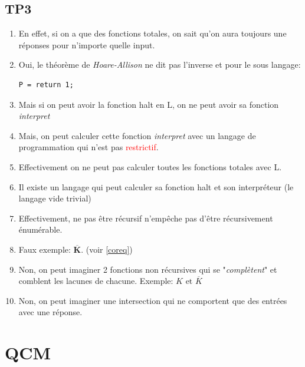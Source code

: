 \documentclass{report}
\begin{document}
\section{TP3}
\begin{enumerate}
\item En effet, si on a que des fonctions totales, on sait qu'on aura toujours une réponses pour n'importe quelle input.
\item Oui, le théorème de \textit{Hoare-Allison} ne dit pas l'inverse et pour le sous langage:
\begin{lstlisting}
P = return 1;
\end{lstlisting}
\item Mais si on peut avoir la fonction halt en L, on ne peut avoir sa fonction \textit{interpret}
\item Mais, on peut calculer cette fonction \textit{interpret} avec un langage de programmation qui n'est pas \textcolor{red}{restrictif}.
\item Effectivement on ne peut pas calculer toutes les fonctions totales avec L.
\item Il existe un langage qui peut calculer sa fonction halt et son interpréteur (le langage vide trivial)
\item Effectivement, ne pas être récursif n'empêche pas d'être récursivement énumérable.
\item Faux exemple: $\overline{\textbf{K}}$. (voir \ref{coreq})
\item Non, on peut imaginer 2 fonctions non récursives qui se "\textit{complètent}" et comblent les lacunes de chacune. Exemple: $K \text{ et } \overline{K}$
\item Non, on peut imaginer une intersection qui ne comportent que des entrées avec une réponse.
\end{enumerate}

\chapter{QCM}
\end{document}
